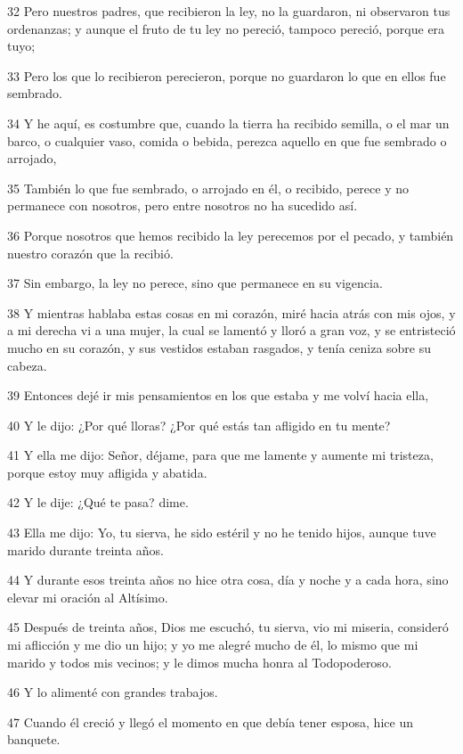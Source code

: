 \par 32 Pero nuestros padres, que recibieron la ley, no la guardaron, ni observaron tus ordenanzas; y aunque el fruto de tu ley no pereció, tampoco pereció, porque era tuyo;
\par 33 Pero los que lo recibieron perecieron, porque no guardaron lo que en ellos fue sembrado.
\par 34 Y he aquí, es costumbre que, cuando la tierra ha recibido semilla, o el mar un barco, o cualquier vaso, comida o bebida, perezca aquello en que fue sembrado o arrojado,
\par 35 También lo que fue sembrado, o arrojado en él, o recibido, perece y no permanece con nosotros, pero entre nosotros no ha sucedido así.
\par 36 Porque nosotros que hemos recibido la ley perecemos por el pecado, y también nuestro corazón que la recibió.
\par 37 Sin embargo, la ley no perece, sino que permanece en su vigencia.
\par 38 Y mientras hablaba estas cosas en mi corazón, miré hacia atrás con mis ojos, y a mi derecha vi a una mujer, la cual se lamentó y lloró a gran voz, y se entristeció mucho en su corazón, y sus vestidos estaban rasgados, y tenía ceniza sobre su cabeza.
\par 39 Entonces dejé ir mis pensamientos en los que estaba y me volví hacia ella,
\par 40 Y le dijo: ¿Por qué lloras? ¿Por qué estás tan afligido en tu mente?
\par 41 Y ella me dijo: Señor, déjame, para que me lamente y aumente mi tristeza, porque estoy muy afligida y abatida.
\par 42 Y le dije: ¿Qué te pasa? dime.
\par 43 Ella me dijo: Yo, tu sierva, he sido estéril y no he tenido hijos, aunque tuve marido durante treinta años.
\par 44 Y durante esos treinta años no hice otra cosa, día y noche y a cada hora, sino elevar mi oración al Altísimo.
\par 45 Después de treinta años, Dios me escuchó, tu sierva, vio mi miseria, consideró mi aflicción y me dio un hijo; y yo me alegré mucho de él, lo mismo que mi marido y todos mis vecinos; y le dimos mucha honra al Todopoderoso.
\par 46 Y lo alimenté con grandes trabajos.
\par 47 Cuando él creció y llegó el momento en que debía tener esposa, hice un banquete.

